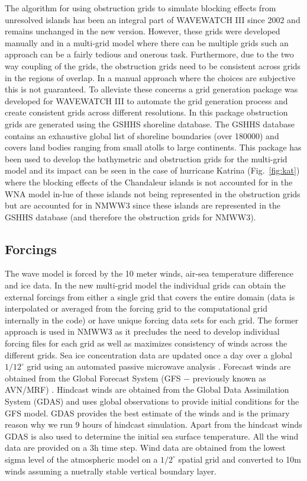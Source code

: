 \documentclass[12pt]{article}
\newcommand{\degree}{^\circ}
\begin{document}
The algorithm for using obstruction grids to simulate blocking effects
from unresolved islands \cite[]{tolman-03} has been an integral part
of WAVEWATCH III since 2002 and remains unchanged in the new
version. However, these grids were developed manually and in a
multi-grid model where there can be multiple grids such an approach
can be a fairly tedious and onerous task. Furthermore, due to the two
way coupling of the grids, the obstruction grids need to be consistent
across grids in the regions of overlap. In a manual approach where the
choices are subjective this is not guaranteed. To alleviate these
concerns a grid generation package was developed
\cite[]{chawla-07,chawla-08} for WAVEWATCH III to automate the grid
generation process and create consistent grids across different
resolutions. In this package obstruction grids are generated using the
GSHHS shoreline database. The GSHHS database \cite[]{wessel-96}
contains an exhaustive global list of shoreline boundaries (over
180000) and covers land bodies ranging from small atolls to large
continents. This package has been used to develop the bathymetric and
obstruction grids for the multi-grid model and its impact can be seen
in the case of hurricane Katrina (Fig.~\ref{fig:kat}) where the
blocking effects of the Chandaleur islands is not accounted for in the
WNA model in-lue of these islands not being represented in the
obstruction grids but are accounted for in NMWW3 since these islands
are represented in the GSHHS database (and therefore the obstruction
grids for NMWW3).

\subsection{Forcings} 

The wave model is forced by the 10 meter winds, air-sea temperature
difference and ice data. In the new multi-grid model the individual
grids can obtain the external forcings from either a single grid that
covers the entire domain (data is interpolated or averaged from the
forcing grid to the computational grid internally in the code) or have
unique forcing data sets for each grid. The former approach is used in
NMWW3 as it precludes the need to develop individual forcing files for
each grid as well as maximizes consistency of winds across the
different grids. Sea ice concentration data are updated once a day
over a global $1/12\degree$ grid using an automated passive microwave
analysis \cite[]{grumbine-96}. Forecast winds are obtained from the
Global Forecast System (GFS $-$ previously known as AVN/MRF)
\cite[]{kanamitsu-89,kanamitsuetal-91,caplanetal-97}. Hindcast winds
are obtained from the Global Data Assimilation System (GDAS)
\cite[]{kanamitsu-89,derberetal-91} and uses global observations to
provide initial conditions for the GFS model. GDAS provides the best
estimate of the winds and is the primary reason why we run 9 hours of
hindcast simulation. Apart from the hindcast winds GDAS is also used
to determine the initial sea surface temperature. All the wind data
are provided on a 3h time step. Wind data are obtained from the lowest
sigma level of the atmospheric model on a $1/2\degree$ spatial grid
and converted to 10m winds assuming a nuetrally stable vertical
boundary layer.
\end{document}
